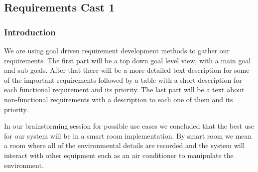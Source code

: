 \documentclass[../document]{subfiles}
\begin{document}
\subsection{Requirements Cast 1}
\label{sec:requirements_cast_1}
\subsubsection{Introduction}
We are using goal driven requirement development methods to gather our requirements. The first part will be a top down goal level view, with a main goal and sub goals. After that there will be a more detailed text description for some of the important requirements followed by a table with a short description for each functional requirement and its priority. The last part will be a text about non-functional requirements with a description to each one of them and its priority.

In our brainstorming session for possible use cases we concluded that the best use for our system will be in a smart room implementation. By smart room we mean a room where all of the environmental details are recorded and the system will interact with other equipment such as an air conditioner to manipulate the environment.
\end{document}
